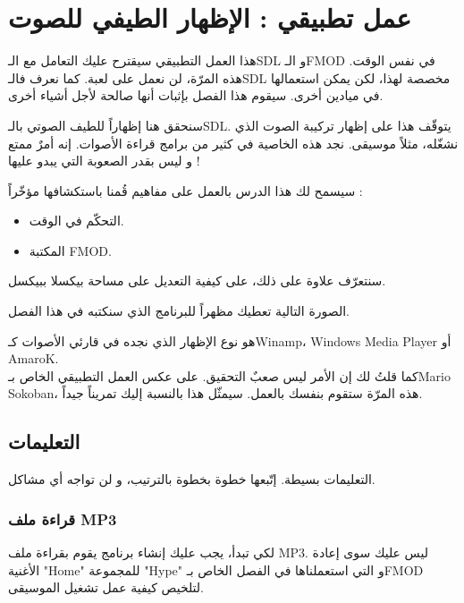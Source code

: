 \chapter{عمل تطبيقي : الإظهار الطيفي للصوت}

هذا العمل التطبيقي سيقترح عليك التعامل مع الـ\textenglish{SDL}
و الـ\textenglish{FMOD}
في نفس الوقت. هذه المرّة، لن نعمل على لعبة. كما نعرف فالـ\textenglish{SDL}
مخصصة لهذا، لكن يمكن استعمالها في ميادين أخرى. سيقوم هذا الفصل بإثبات أنها صالحة لأجل أشياء أخرى.

سنحقق هنا إظهاراً للطيف الصوتي بالـ\textenglish{SDL}.
يتوقّف هذا على إظهار تركيبة الصوت الذي نشغّله، مثلاً موسيقى. نجد هذه الخاصية في كثير من برامج قراءة الأصوات. إنه أمرٌ ممتع و ليس بقدر الصعوبة التي يبدو عليها !

سيسمح لك هذا الدرس بالعمل على مفاهيم قُمنا باستكشافها مؤخّراً :

\begin{itemize}
	\item التحكّم في الوقت.
	\item المكتبة 
	\textenglish{FMOD}.
\end{itemize}

سنتعرّف علاوة على ذلك، على كيفية التعديل على مساحة بيكسلا ببيكسل.

الصورة التالية تعطيك مظهراً للبرنامج الذي سنكتبه في هذا الفصل.


هو نوع الإظهار الذي نجده في قارئي الأصوات كـ\textenglish{Winamp}،
\textenglish{Windows Media Player} أو \textenglish{AmaroK}.\\
كما قلتُ لك إن الأمر ليس صعبٌ التحقيق. على عكس العمل التطبيقي الخاص بـ\textenglish{Mario Sokoban}،
هذه المرّة ستقوم بنفسك بالعمل. سيمثّل هذا بالنسبة إليك تمريناً جيداً.

\section{التعليمات}

التعليمات بسيطة. إتّبعها خطوة بخطوة بالترتيب، و لن تواجه أي مشاكل.

\subsection{قراءة ملف \textenglish{MP3}}

لكي تبدأ، يجب عليك إنشاء برنامج يقوم بقراءة ملف
\textenglish{MP3}. ليس عليك سوى إعادة
الأغنية 
"\textenglish{Home}"
للمجموعة
"\textenglish{Hype}"
و التي استعملناها في الفصل الخاص بـ\textenglish{FMOD}
لتلخيص كيفية عمل تشغيل الموسيقى.

